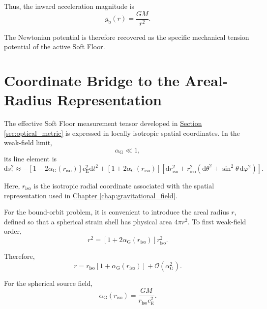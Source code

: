 Thus, the inward acceleration magnitude is
\begin{equation}
    g_{\mathrm{b}}(r) = \frac{GM}{r^2}.
\end{equation}

The Newtonian potential is therefore recovered as the specific mechanical tension potential of the active Soft Floor.

\section{Coordinate Bridge to the Areal-Radius Representation}

The effective Soft Floor measurement tensor developed in \hyperref[sec:optical_metric]{Section \ref*{sec:optical_metric}} is expressed in locally isotropic spatial coordinates. In the weak-field limit,
\begin{equation}
    \alpha_{\mathrm{G}} \ll 1,
\end{equation}
its line element is
\begin{equation}
    \mathrm{d}s_\tau^2 \approx - \left[ 1-2\alpha_{\mathrm{G}}(r_{\mathrm{iso}}) \right] c_{\mathrm{E}}^2\mathrm{d}t^2 + \left[ 1+2\alpha_{\mathrm{G}}(r_{\mathrm{iso}}) \right] \left[ \mathrm{d}r_{\mathrm{iso}}^2 + r_{\mathrm{iso}}^2 \left( \mathrm{d}\theta^2 + \sin^2\theta \, \mathrm{d}\varphi^2 \right) \right].
\end{equation}

Here, $r_{\mathrm{iso}}$ is the isotropic radial coordinate associated with the spatial representation used in \hyperref[chap:gravitational_field]{Chapter \ref*{chap:gravitational_field}}.

For the bound-orbit problem, it is convenient to introduce the areal radius $r$, defined so that a spherical strain shell has physical area $4\pi r^2$. To first weak-field order,
\begin{equation}
    r^2 = \left[ 1+2\alpha_{\mathrm{G}}(r_{\mathrm{iso}}) \right] r_{\mathrm{iso}}^2.
\end{equation}

Therefore,
\begin{equation}
    r = r_{\mathrm{iso}} \left[ 1+\alpha_{\mathrm{G}}(r_{\mathrm{iso}}) \right] + \mathcal{O}(\alpha_{\mathrm{G}}^2).
\end{equation}

For the spherical source field,
\begin{equation}
    \alpha_{\mathrm{G}}(r_{\mathrm{iso}}) = \frac{GM}{r_{\mathrm{iso}}c_{\mathrm{E}}^2}.
\end{equation}

